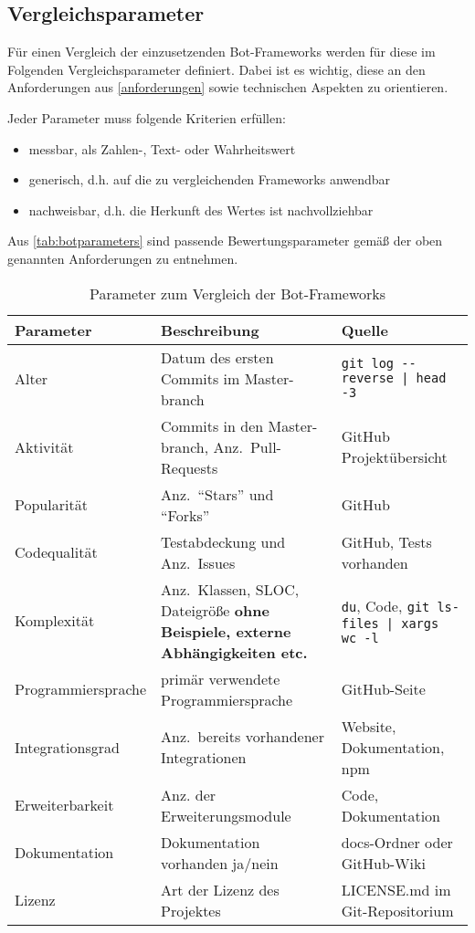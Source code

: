 
\subsection{Vergleichsparameter}
Für einen Vergleich der einzusetzenden Bot-Frameworks werden für diese im Folgenden Vergleichsparameter definiert. Dabei ist es wichtig, diese an den Anforderungen aus \autoref{anforderungen} sowie technischen Aspekten zu orientieren.

Jeder Parameter muss folgende Kriterien erfüllen:

\begin{itemize}
    \item messbar, als Zahlen-, Text- oder Wahrheitswert
    \item generisch, d.h. auf die zu vergleichenden Frameworks anwendbar
    \item nachweisbar, d.h. die Herkunft des Wertes ist nachvollziehbar
\end{itemize}

Aus \autoref{tab:botparameters} sind passende Bewertungsparameter gemäß der oben genannten Anforderungen zu entnehmen.

\begin{table}[htbp]
    \begin{tabularx}{\textwidth}{|l|X|p{6cm}|}
   \hline
   \textbf{Parameter} & \textbf{Beschreibung} & \textbf{Quelle} \\
   \hline
   Alter & Datum des ersten Commits im Master-branch & \verb+git log --reverse | head -3+\\
   \hline
   Aktivität & Commits in den Master-branch, Anz.\ Pull-Requests & GitHub Projektübersicht \\
   \hline
   Popularität & Anz.\ \enquote{Stars} und \enquote{Forks} & GitHub \\
    \hline
   Codequalität & Testabdeckung und Anz.\ Issues & GitHub, Tests vorhanden \\
   \hline
   Komplexität & Anz.\ Klassen, SLOC, Dateigröße \textbf{ohne Beispiele, externe Abhängigkeiten etc.} & \verb+du+, Code, \verb+git ls-files | xargs wc -l+ \\
   \hline
   Programmiersprache & primär verwendete Programmiersprache & GitHub-Seite \\
   \hline
   Integrationsgrad & Anz.\ bereits vorhandener Integrationen & Website, Dokumentation, npm \\
   \hline
   Erweiterbarkeit & Anz. der Erweiterungsmodule & Code, Dokumentation \\
   \hline
   Dokumentation & Dokumentation vorhanden ja/nein & docs-Ordner oder GitHub-Wiki \\
   \hline
   Lizenz & Art der Lizenz des Projektes & LICENSE.md im Git-Repositorium \\
   \hline
\end{tabularx}
\caption{Parameter zum Vergleich der Bot-Frameworks}
\label{tab:botparameters}
\end{table}

